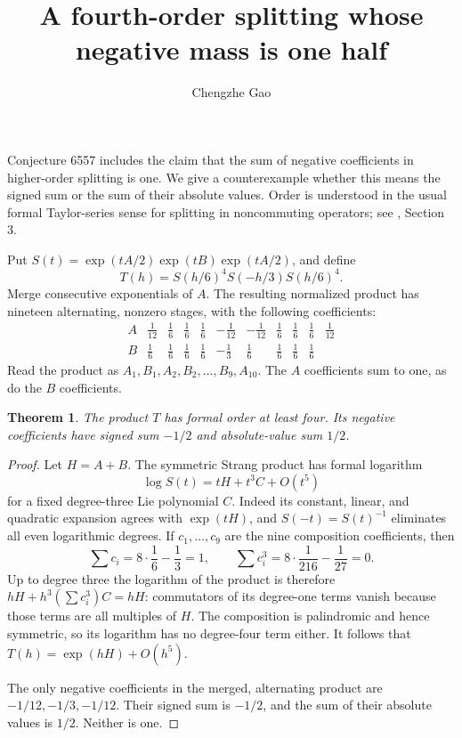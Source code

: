 \documentclass[11pt]{article}
\newtheorem{theorem}{Theorem}
\begin{document}
\title{A fourth-order splitting whose negative mass is one half}
\author{Chengzhe Gao}\date{}\maketitle
Conjecture 6557 includes the claim that the sum of negative coefficients
in higher-order splitting is one. We give a counterexample whether this
means the signed sum or the sum of their absolute values.
Order is understood in the usual formal Taylor-series sense for splitting
in noncommuting operators; see \cite{BCM}, Section 3.

Put $S(t)=\exp(tA/2)\exp(tB)\exp(tA/2)$, and define
\[
 T(h)=S(h/6)^4S(-h/3)S(h/6)^4.
\]
Merge consecutive exponentials of $A$. The resulting normalized product
has nineteen alternating, nonzero stages, with the following coefficients:
\[
\begin{array}{c|rrrrrrrrrr}
 A&\frac1{12}&\frac16&\frac16&\frac16&-\frac1{12}&-\frac1{12}
     &\frac16&\frac16&\frac16&\frac1{12}\\[3pt]
 B&\frac16&\frac16&\frac16&\frac16&-\frac13&\frac16&\frac16
     &\frac16&\frac16&
\end{array}
\]
Read the product as $A_1,B_1,A_2,B_2,\ldots,B_9,A_{10}$.
The $A$ coefficients sum to one, as do the $B$ coefficients.

\begin{theorem}
The product $T$ has formal order at least four. Its negative coefficients
have signed sum $-1/2$ and absolute-value sum $1/2$.
\end{theorem}
\begin{proof}
Let $H=A+B$. The symmetric Strang product has formal logarithm
\[
 \log S(t)=tH+t^3C+O(t^5)
\]
for a fixed degree-three Lie polynomial $C$. Indeed its constant,
linear, and quadratic expansion agrees with $\exp(tH)$, and
$S(-t)=S(t)^{-1}$ eliminates all even logarithmic degrees.
If $c_1,\ldots,c_9$ are the nine composition coefficients, then
\[
 \sum c_i=8\cdot\frac16-\frac13=1,\qquad
 \sum c_i^3=8\cdot\frac1{216}-\frac1{27}=0.
\]
Up to degree three the logarithm of the product is therefore
$hH+h^3(\sum c_i^3)C=hH$: commutators of its degree-one terms vanish
because those terms are all multiples of $H$. The composition is
palindromic and hence symmetric, so its logarithm has no degree-four
term either. It follows that $T(h)=\exp(hH)+O(h^5)$.

The only negative coefficients in the merged, alternating product are
$-1/12,-1/3,-1/12$. Their signed sum is $-1/2$, and the sum of their
absolute values is $1/2$. Neither is one.
\end{proof}
\end{document}
